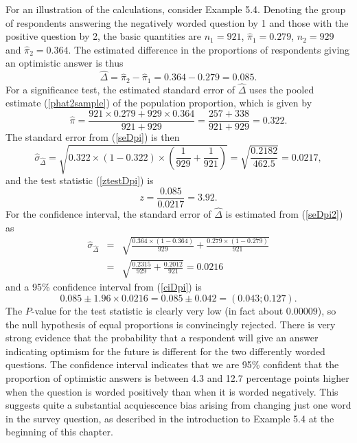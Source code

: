 For an illustration of the calculations, consider Example 5.4. Denoting
the group of respondents answering the negatively worded question by 1
and those with the positive question by 2, the basic quantities are
$n_{1}=921$, $\hat{\pi}_{1}=0.279$, $n_{2}=929$ and
$\hat{\pi}_{2}=0.364$. The estimated difference in the proportions of
respondents giving an optimistic answer is thus
\[
\hat{\Delta} = \hat{\pi}_{2}-\hat{\pi}_{1} = 0.364-0.279 = 0.085.
\]
For a significance test, the estimated standard error of $\hat{\Delta}$
uses the pooled estimate (\ref{phat2sample}) of the population
proportion, which is given by
\[
\hat{\pi} = \frac{921\times 0.279+929\times 0.364}{921+929}=
\frac{257+338}{921+929} = 0.322.
\]
The standard error from (\ref{seDpi}) is then
\[
\hat{\sigma}_{\hat{\Delta}}
=
\sqrt{
0.322\times(1-0.322) \times \left(
\frac{1}{929}+
\frac{1}{921}
\right)
}
=
\sqrt{
\frac{0.2182}{462.5}
}=0.0217,
\]
and the test statistic (\ref{ztestDpi}) is
\[
z=\frac{0.085}{0.0217}=3.92.
\]
For the confidence interval, the standard error of $\hat{\Delta}$
is estimated from (\ref{seDpi2}) as
\begin{eqnarray*}
\hat{\sigma}_{\hat{\Delta}} &=&
\sqrt{
\frac{0.364\times (1-0.364)}{929} +
\frac{0.279\times (1-0.279)}{921}
} \\
&=&
\sqrt{
\frac{0.2315}{929}
+\frac{0.2012}{921}
}=0.0216
\end{eqnarray*}
and a 95\%  confidence interval from (\ref{ciDpi}) is
\[
0.085 \pm 1.96 \times 0.0216 = 0.085\pm 0.042 = (0.043; 0.127).
\]
The $P$-value for the test statistic is clearly very low (in fact about
$0.00009$), so the null hypothesis of equal proportions is convincingly
rejected. There is very strong evidence that the probability that a
respondent will give an answer indicating optimism for the future is
different for the two differently worded questions. The confidence
interval indicates that we are 95\% confident that the proportion of
optimistic answers is between 4.3 and 12.7 percentage points higher when
the question is worded positively than when it is worded negatively.
This suggests quite a substantial acquiescence bias arising from
changing just one word in the survey question, as described in the
introduction to Example 5.4 at the beginning of this chapter.

